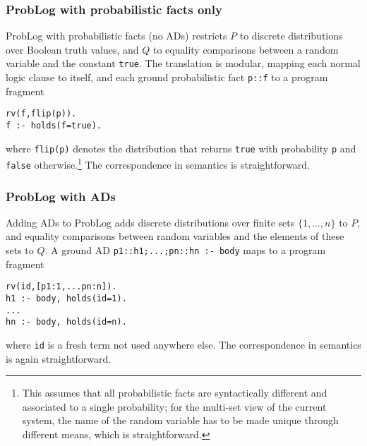 \subsubsection{ProbLog with probabilistic facts only}
ProbLog with probabilistic facts (no ADs) restricts $P$ to discrete distributions over Boolean truth values, and $Q$ to equality comparisons between a random variable and the constant \verb|true|. The translation is modular, mapping each normal logic clause to itself, and each ground probabilistic fact \verb|p::f| to a program fragment
\begin{verbatim}
rv(f,flip(p)).
f :- holds(f=true).
\end{verbatim}
where \verb|flip(p)| denotes the distribution that returns \verb|true| with probability \verb|p| and \verb|false| otherwise.\footnote{This assumes that all probabilistic facts are syntactically different and associated to a single probability; for the multi-set view of the current system, the name of the random variable has to be made unique through different means, which is straightforward.} The correspondence in semantics is straightforward. 

\subsubsection{ProbLog with ADs}
Adding ADs to ProbLog adds discrete distributions over finite sets $\{1,...,n\}$ to $P$, and equality comparisons between random variables and the elements of these sets to $Q$.
A ground AD \verb|p1::h1;...;pn::hn :- body| maps to a program fragment
\begin{verbatim}
rv(id,[p1:1,...pn:n]).
h1 :- body, holds(id=1).
...
hn :- body, holds(id=n).
\end{verbatim}
where \verb|id| is a fresh term not used anywhere else. The correspondence in semantics is again straightforward. 




